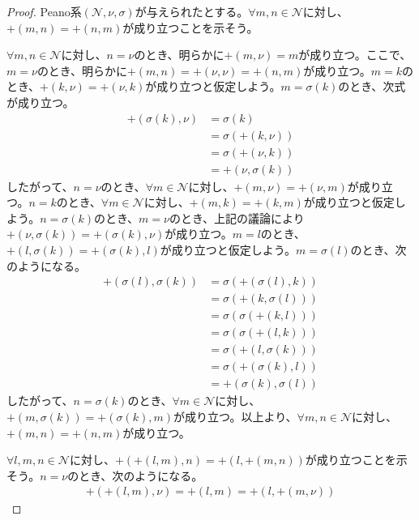 \documentclass[dvipdfmx]{jsarticle}
\begin{document}
\begin{proof}
Peano系$\left( \mathcal{N,}\nu,\sigma \right)$が与えられたとする。$\forall m,n \in \mathcal{N}$に対し、$+ (m,n) = + (n,m)$が成り立つことを示そう。\par
$\forall m,n \in \mathcal{N}$に対し、$n = \nu$のとき、明らかに$+ (m,\nu) = m$が成り立つ。ここで、$m = \nu$のとき、明らかに$+ (m,n) = + (\nu,\nu) = + (n,m)$が成り立つ。$m = k$のとき、$+ (k,\nu) = + (\nu,k)$が成り立つと仮定しよう。$m = \sigma(k)$のとき、次式が成り立つ。
\begin{align*}
+ \left( \sigma(k),\nu \right) &= \sigma(k)\\
&= \sigma\left( + (k,\nu) \right)\\
&= \sigma\left( + (\nu,k) \right)\\
&= + \left( \nu,\sigma(k) \right)
\end{align*}
したがって、$n = \nu$のとき、$\forall m \in \mathcal{N}$に対し、$+ (m,\nu) = + (\nu,m)$が成り立つ。$n = k$のとき、$\forall m \in \mathcal{N}$に対し、$+ (m,k) = + (k,m)$が成り立つと仮定しよう。$n = \sigma(k)$のとき、$m = \nu$のとき、上記の議論により$+ \left( \nu,\sigma(k) \right) = + \left( \sigma(k),\nu \right)$が成り立つ。$m = l$のとき、$+ \left( l,\sigma(k) \right) = + \left( \sigma(k),l \right)$が成り立つと仮定しよう。$m = \sigma(l)$のとき、次のようになる。
\begin{align*}
+ \left( \sigma(l),\sigma(k) \right) &= \sigma\left( + \left( \sigma(l),k \right) \right)\\
&= \sigma\left( + \left( k,\sigma(l) \right) \right)\\
&= \sigma\left( \sigma\left( + (k,l) \right) \right)\\
&= \sigma\left( \sigma\left( + (l,k) \right) \right)\\
&= \sigma\left( + \left( l,\sigma(k) \right) \right)\\
&= \sigma\left( + \left( \sigma(k),l \right) \right)\\
&= + \left( \sigma(k),\sigma(l) \right)
\end{align*}
したがって、$n = \sigma(k)$のとき、$\forall m \in \mathcal{N}$に対し、$+ \left( m,\sigma(k) \right) = + \left( \sigma(k),m \right)$が成り立つ。以上より、$\forall m,n \in \mathcal{N}$に対し、$+ (m,n) = + (n,m)$が成り立つ。\par
$\forall l,m,n \in \mathcal{N}$に対し、$+ \left( + (l,m),n \right) = + \left( l, + (m,n) \right)$が成り立つことを示そう。$n = \nu$のとき、次のようになる。
\begin{align*}
+ \left( + (l,m),\nu \right) = + (l,m) = + \left( l, + (m,\nu) \right)

\end{align*}
\end{proof}
\end{document}
